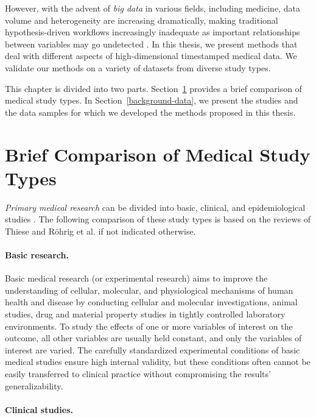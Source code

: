 \documentclass[
  oneside]{book}
\begin{document}
However, with the advent of \emph{big data} \autocite{oussous2018big} in various fields, including medicine, data volume and heterogeneity are increasing dramatically, making traditional hypothesis-driven workflows increasingly inadequate as important relationships between variables may go undetected \autocite{viceconti2015big}.
In this thesis, we present methods that deal with different aspects of high-dimensional timestamped medical data.
We validate our methods on a variety of datasets from diverse study types.

This chapter is divided into two parts.
Section~\ref{background-med-research} provides a brief comparison of medical study types.
In Section~\ref{background-data}, we present the studies and the data samples for which we developed the methods proposed in this thesis.

\hypertarget{background-med-research}{%
\section{Brief Comparison of Medical Study Types}\label{background-med-research}}

\emph{Primary medical research} can be divided into basic, clinical, and epidemiological studies \autocite{Roehrig:Arztebl2009}.
The following comparison of these study types is based on the reviews of Thiese \autocite{thiese2014observational} and Röhrig et al. \autocite{Roehrig:Arztebl2009} if not indicated otherwise.

\paragraph*{Basic research.}

Basic medical research (or experimental research) aims to improve the understanding of cellular, molecular, and physiological mechanisms of human health and disease by conducting cellular and molecular investigations, animal studies, drug and material property studies in tightly controlled laboratory environments.
To study the effects of one or more variables of interest on the outcome, all other variables are usually held constant, and only the variables of interest are varied.
The carefully standardized experimental conditions of basic medical studies ensure high internal validity, but these conditions often cannot be easily transferred to clinical practice without compromising the results' generalizability.

\paragraph*{Clinical studies.}
\end{document}
